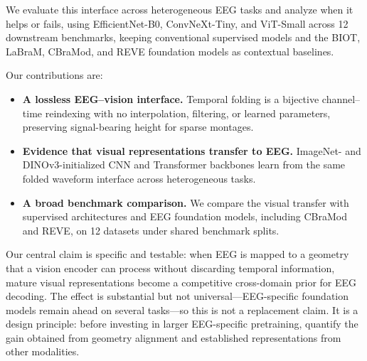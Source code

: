 We evaluate this interface across heterogeneous EEG tasks and analyze when it
helps or fails, using EfficientNet-B0, ConvNeXt-Tiny, and ViT-Small
across 12 downstream benchmarks, keeping conventional supervised models and
the BIOT, LaBraM, CBraMod, and REVE foundation models as contextual baselines.

Our contributions are:

\begin{itemize}
    \item \textbf{A lossless EEG--vision interface.} Temporal folding is a
    bijective channel--time reindexing with no interpolation, filtering, or
    learned parameters, preserving signal-bearing height for sparse montages.
    \item \textbf{Evidence that visual representations transfer to EEG.}
    ImageNet- and DINOv3-initialized CNN and Transformer backbones learn from
    the same folded waveform interface across heterogeneous tasks.
    \item \textbf{A broad benchmark comparison.} We compare the visual
    transfer with supervised architectures and EEG foundation models, including
    CBraMod and REVE, on 12 datasets under shared benchmark splits.
\end{itemize}

Our central claim is specific and testable: when EEG is mapped to a geometry
that a vision encoder can process without discarding temporal information,
mature visual representations become a competitive cross-domain prior for EEG
decoding. The effect is substantial but not universal—EEG-specific foundation
models remain ahead on several tasks—so this is not a replacement claim. It is
a design principle: before investing in larger EEG-specific pretraining,
quantify the gain obtained from geometry alignment and established
representations from other modalities.
